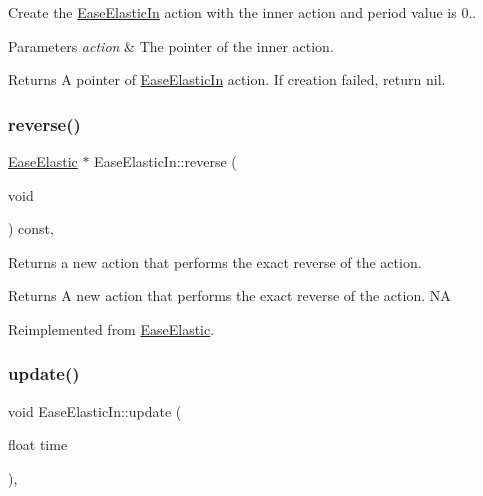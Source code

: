 Create the \hyperlink{classEaseElasticIn}{Ease\+Elastic\+In} action with the inner action and period value is 0.. 


\begin{DoxyParams}{Parameters}
{\em action} & The pointer of the inner action. \\
\hline
\end{DoxyParams}
\begin{DoxyReturn}{Returns}
A pointer of \hyperlink{classEaseElasticIn}{Ease\+Elastic\+In} action. If creation failed, return nil. 
\end{DoxyReturn}
\mbox{\label{classEaseElasticIn_ae29b6a632f6721e3b43786df80b86cc1}} 
\subsubsection{\texorpdfstring{reverse()}{reverse()}}
{\footnotesize\ttfamily \hyperlink{classEaseElastic}{Ease\+Elastic} $\ast$ Ease\+Elastic\+In\+::reverse (\begin{DoxyParamCaption}\item[{void}]{ }\end{DoxyParamCaption}) const\hspace{0.3cm}{\ttfamily [override]}, {\ttfamily [virtual]}}

Returns a new action that performs the exact reverse of the action.

\begin{DoxyReturn}{Returns}
A new action that performs the exact reverse of the action.  NA 
\end{DoxyReturn}


Reimplemented from \hyperlink{classEaseElastic_a9e0e8c55fbe1c50c706dd3d62834ed82}{Ease\+Elastic}.

\mbox{\label{classEaseElasticIn_acd62b61c4f4013bd98dcd991fbe9e276}} 
\subsubsection{\texorpdfstring{update()}{update()}}
{\footnotesize\ttfamily void Ease\+Elastic\+In\+::update (\begin{DoxyParamCaption}\item[{float}]{time }\end{DoxyParamCaption})\hspace{0.3cm}{\ttfamily [override]}, {\ttfamily [virtual]}}

